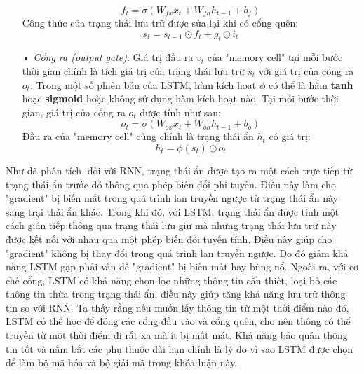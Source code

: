\begin{itemize}
	\begin{equation} \label{forgetGateLSTM}
	f_t = \sigma \left(W_{fx}x_t + W_{fh}h_{t-1} + b_f \right)
	\end{equation}
	Công thức của trạng thái lưu trữ được sửa lại khi có cổng quên:
	\begin{equation} \label{cellStateWithForgetGateLSTM}
	s_t = s_{t-1} \odot f_t + g_t \odot i_t
	\end{equation}
	\item[•] \textit{Cổng ra (output gate)}: Giá trị đầu ra $v_t$ của "memory cell" tại mỗi bước thời gian chính là tích giá trị của trạng thái lưu trữ $s_t$ với giá trị của cổng ra $o_t$. Trong một số phiên bản của LSTM, hàm kích hoạt $\phi$ có thể là hàm \textbf{tanh} hoặc \textbf{sigmoid} hoặc không sử dụng hàm kích hoạt nào. Tại mỗi bước thời gian, giá trị của cổng ra $o_t$ được tính như sau:
	\begin{equation} \label{outputGateLSTM}
	o_t = \sigma \left(W_{ox}x_t + W_{oh}h_{t-1} + b_o \right)
	\end{equation}
	Đầu ra của "memory cell" cũng chính là trạng thái ẩn $h_t$ có giá trị:
	\begin{equation} \label{outputNodeLSTM}
	h_t = \phi(s_t) \odot o_t 
	\end{equation}
\end{itemize}

Như đã phân tích, đối với RNN, trạng thái ẩn được tạo ra một cách trực tiếp từ trạng thái ẩn trước đó thông qua phép biến đổi phi tuyến. Điều này làm cho "gradient" bị biến mất trong quá trình lan truyền ngược từ trạng thái ẩn này sang trại thái ẩn khác. Trong khi đó, với LSTM, trạng thái ẩn được tính một cách gián tiếp thông qua trạng thái lưu giữ mà những trạng thái lưu trữ này được kết nối với nhau qua một phép biến đổi tuyến tính. Điều này giúp cho "gradient" không bị thay đổi trong quá trình lan truyền ngược. Do đó giảm khả năng LSTM gặp phải vấn đề "gradient" bị biến mất hay bùng nổ. Ngoài ra, với cơ chế cổng, LSTM có khả năng chọn lọc những thông tin cần thiết, loại bỏ các thông tin thừa trong trạng thái ẩn, điều này giúp tăng khả năng lưu trữ thông tin so với RNN. Ta thấy rằng nếu muốn lấy thông tin từ một thời điểm nào đó, LSTM có thể học để đóng các cổng đầu vào và cổng quên, cho nên thông có thể truyền từ một thời điểm đi rất xa mà ít bị mất mát. Khả năng bảo quản thông tin tốt và nắm bắt các phụ thuộc dài hạn chính là lý do vì sao LSTM được chọn để làm bộ mã hóa và bộ giải mã trong khóa luận này.

